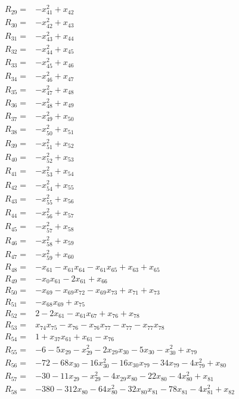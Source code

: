 \begin{align*}
R_{29}={}&-x_{41}^{2}+x_{42}\\[3pt]
R_{30}={}&-x_{42}^{2}+x_{43}\\[3pt]
R_{31}={}&-x_{43}^{2}+x_{44}\\[3pt]
R_{32}={}&-x_{44}^{2}+x_{45}\\[3pt]
R_{33}={}&-x_{45}^{2}+x_{46}\\[3pt]
R_{34}={}&-x_{46}^{2}+x_{47}\\[3pt]
R_{35}={}&-x_{47}^{2}+x_{48}\\[3pt]
R_{36}={}&-x_{48}^{2}+x_{49}\\[3pt]
R_{37}={}&-x_{49}^{2}+x_{50}\\[3pt]
R_{38}={}&-x_{50}^{2}+x_{51}\\[3pt]
R_{39}={}&-x_{51}^{2}+x_{52}\\[3pt]
R_{40}={}&-x_{52}^{2}+x_{53}\\[3pt]
R_{41}={}&-x_{53}^{2}+x_{54}\\[3pt]
R_{42}={}&-x_{54}^{2}+x_{55}\\[3pt]
R_{43}={}&-x_{55}^{2}+x_{56}\\[3pt]
R_{44}={}&-x_{56}^{2}+x_{57}\\[3pt]
R_{45}={}&-x_{57}^{2}+x_{58}\\[3pt]
R_{46}={}&-x_{58}^{2}+x_{59}\\[3pt]
R_{47}={}&-x_{59}^{2}+x_{60}\\[3pt]
R_{48}={}&-x_{61}-x_{61}x_{64}-x_{61}x_{65}+x_{63}+x_{65}\\[3pt]
R_{49}={}&-x_{0}x_{61}-2x_{61}+x_{66}\\[3pt]
R_{50}={}&-x_{69}-x_{69}x_{72}-x_{69}x_{73}+x_{71}+x_{73}\\[3pt]
R_{51}={}&-x_{68}x_{69}+x_{75}\\[3pt]
R_{52}={}&2-2x_{61}-x_{61}x_{67}+x_{76}+x_{78}\\[3pt]
R_{53}={}&x_{74}x_{75}-x_{76}-x_{76}x_{77}-x_{77}-x_{77}x_{78}\\[3pt]
R_{54}={}&1+x_{37}x_{61}+x_{61}-x_{76}\\[3pt]
R_{55}={}&-6-5x_{29}-x_{29}^{2}-2x_{29}x_{30}-5x_{30}-x_{30}^{2}+x_{79}\\[3pt]
R_{56}={}&-72-68x_{30}-16x_{30}^{2}-16x_{30}x_{79}-34x_{79}-4x_{79}^{2}+x_{80}\\[3pt]
R_{57}={}&-30-11x_{29}-x_{29}^{2}-4x_{29}x_{80}-22x_{80}-4x_{80}^{2}+x_{81}\\[3pt]
R_{58}={}&-380-312x_{80}-64x_{80}^{2}-32x_{80}x_{81}-78x_{81}-4x_{81}^{2}+x_{82}\\[3pt]

\end{align*}
